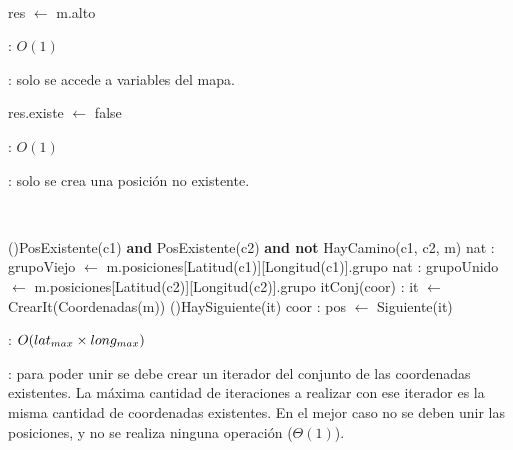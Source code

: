 \begin{Algoritmos}
	~

	\begin{algorithm}[H]
		\NoCaptionOfAlgo
		\caption{}
		res $\leftarrow$ m.alto
	\end{algorithm}

	\complejidad: $O(1)$

	\justifcomp: solo se accede a variables del mapa.



	\begin{algorithm}[H]
		\NoCaptionOfAlgo
		\BlankLine
		\caption{}
		res.existe $\leftarrow$ false
	\end{algorithm}

	\complejidad: $O(1)$

	\justifcomp: solo se crea una posición no existente.

	~

	\begin{algorithm}[H]
		\NoCaptionOfAlgo
		\caption{}
		\BlankLine
		\If(\OdeBloque{\compmatriz}){PosExistente(c1) \textbf{and} PosExistente(c2) \textbf{and not} HayCamino(c1, c2, m)}{
			nat : grupoViejo $\leftarrow$ m.posiciones[Latitud(c1)][Longitud(c1)].grupo
			nat : grupoUnido $\leftarrow$ m.posiciones[Latitud(c2)][Longitud(c2)].grupo
			itConj(coor) : it $\leftarrow$ CrearIt(Coordenadas(m))\OdeLinea{\compmatriz}
			\While(\OdeBloque{\compmatriz}){HaySiguiente(it)}{
				coor : pos $\leftarrow$ Siguiente(it)
			}
		}
	\end{algorithm}

	\complejidad: $O(lat_{max} \times long_{max})$

	\justifcomp: para poder unir se debe crear un iterador del conjunto de las coordenadas existentes. La máxima cantidad de iteraciones a realizar con ese iterador es la misma cantidad de coordenadas existentes. En el mejor caso no se deben unir las posiciones, y no se realiza ninguna operación ($\Theta(1)$).

\end{Algoritmos}